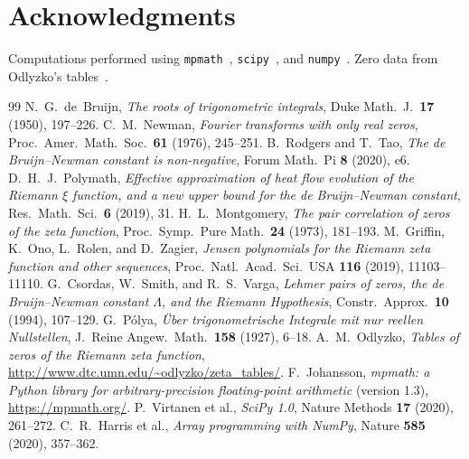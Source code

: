 \documentclass[11pt,a4paper]{article}
\begin{document}
\section*{Acknowledgments}

Computations performed using \texttt{mpmath}~\cite{mpmath},
\texttt{scipy}~\cite{scipy}, and \texttt{numpy}~\cite{numpy}.
Zero data from Odlyzko's tables~\cite{odlyzko}.

\begin{thebibliography}{99}
 N.~G.\ de~Bruijn, \emph{The roots of trigonometric integrals}, Duke Math.\ J.\ \textbf{17} (1950), 197--226.
 C.~M.\ Newman, \emph{Fourier transforms with only real zeros}, Proc.\ Amer.\ Math.\ Soc.\ \textbf{61} (1976), 245--251.
 B.\ Rodgers and T.\ Tao, \emph{The de Bruijn--Newman constant is non-negative}, Forum Math.\ Pi \textbf{8} (2020), e6.
 D.~H.~J.\ Polymath, \emph{Effective approximation of heat flow evolution of the Riemann $\xi$ function, and a new upper bound for the de Bruijn--Newman constant}, Res.\ Math.\ Sci.\ \textbf{6} (2019), 31.
 H.~L.\ Montgomery, \emph{The pair correlation of zeros of the zeta function}, Proc.\ Symp.\ Pure Math.\ \textbf{24} (1973), 181--193.
 M.\ Griffin, K.\ Ono, L.\ Rolen, and D.\ Zagier, \emph{Jensen polynomials for the Riemann zeta function and other sequences}, Proc.\ Natl.\ Acad.\ Sci.\ USA \textbf{116} (2019), 11103--11110.
 G.\ Csordas, W.\ Smith, and R.~S.\ Varga, \emph{Lehmer pairs of zeros, the de Bruijn--Newman constant $\Lambda$, and the Riemann Hypothesis}, Constr.\ Approx.\ \textbf{10} (1994), 107--129.
 G.\ P\'olya, \emph{\"Uber trigonometrische Integrale mit nur reellen Nullstellen}, J.\ Reine Angew.\ Math.\ \textbf{158} (1927), 6--18.
 A.~M.\ Odlyzko, \emph{Tables of zeros of the Riemann zeta function}, \url{http://www.dtc.umn.edu/~odlyzko/zeta_tables/}.
 F.\ Johansson, \emph{mpmath: a Python library for arbitrary-precision floating-point arithmetic} (version 1.3), \url{https://mpmath.org/}.
 P.\ Virtanen et al., \emph{SciPy 1.0}, Nature Methods \textbf{17} (2020), 261--272.
 C.~R.\ Harris et al., \emph{Array programming with NumPy}, Nature \textbf{585} (2020), 357--362.
\end{thebibliography}
\end{document}
